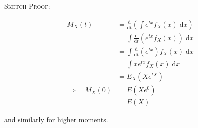 \documentclass[12pt,a4paper]{article}
\newcommand{\diff}{\mathrm{d}}
\begin{document}
\noindent\textsc{Sketch Proof:}\par\vspace{1cm}

\begin{align*}
\dot{M}_X(t) &= \frac{\diff}{\diff t}\left(\int\!\! e^{tx}f_X(x)\;\diff x\right)\\
&= \int\!\!\frac{\diff}{\diff t}\left(e^{tx}f_X(x)\right)\;\diff x\\
&= \int\!\!\frac{\diff}{\diff t}\left(e^{tx}\right)f_X(x)\;\diff x\\
&= \int\!\! xe^{tx}f_X(x)\;\diff x\\
&= E_X\left(Xe^{tX}\right)\\
\Rightarrow\quad \dot{M}_X(0) &= E\left(Xe^0\right)\\
&= E(X)
\end{align*}

and similarly for higher moments.
\end{document}
